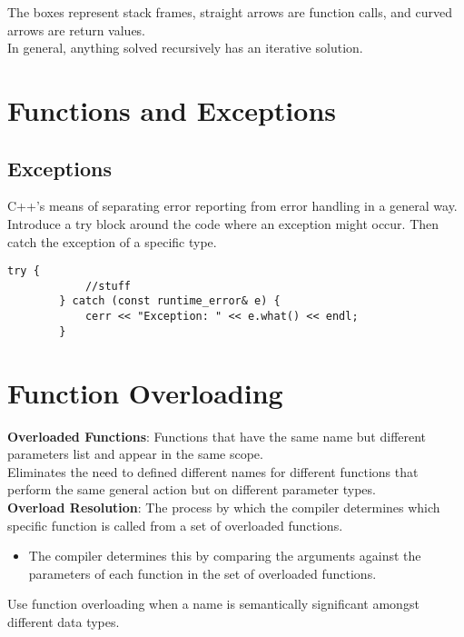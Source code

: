\documentclass{article}
\begin{document}
	The boxes represent stack frames, straight arrows are function calls, and curved arrows are return values.\\
	
	In general, anything solved recursively has an iterative solution.
	
	\section{Functions and Exceptions}
	
	\subsection{Exceptions}
	
	C++'s means of separating error reporting from error handling in a general way.\\
	
	Introduce a try block around the code where an exception might occur. Then catch the exception of a specific type.
	\begin{lstlisting}[gobble=14]
		try {
		    //stuff
		} catch (const runtime_error& e) {
		    cerr << "Exception: " << e.what() << endl;
		}
	\end{lstlisting}
	
	
	\section{Function Overloading}
	
	\textbf{Overloaded Functions}: Functions that have the same name but different parameters list and appear in the same scope.\\
	
	Eliminates the need to defined different names for different functions that perform the same general action but on different parameter types.\\
	
	\textbf{Overload Resolution}: The process by which the compiler determines which specific function is called from a set of overloaded functions. \vspace{-1mm}
	\begin{itemize}
		\item The compiler determines this by comparing the arguments against the parameters of each function in the set of overloaded functions.
	\end{itemize}

	Use function overloading when a name is semantically significant amongst different data types.\\
	
\end{document}
